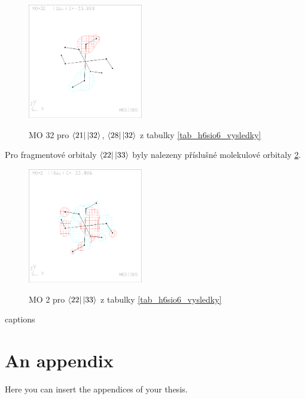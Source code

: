 \documentclass[
  digital, %
  table,   %
  lof,     %
  lot,     %
]{fithesis3}
\begin{document}
\begin{figure}[h]
\caption{MO 32 pro $\bra{21}\ket{32}$, $\bra{28}\ket{32}$  z tabulky \ref{tab_h6sio6_vysledky}}
  \center
  \includegraphics[width=5cm]{h6sio6_obrazky/s2_32.eps}
  \label{obr_h6sio6_MO_s2_32}
  \end{figure}

Pro fragmentové orbitaly $\bra{22}\ket{33}$ byly nalezeny příslušné molekulové orbitaly \ref{obr_h6sio6_MO_s3_2}.
  
  \begin{figure}[h]
\caption{MO 2 pro $\bra{22}\ket{33}$  z tabulky \ref{tab_h6sio6_vysledky}}
  \center
  \includegraphics[width=5cm]{h6sio6_obrazky/s3_2.eps}
  \label{obr_h6sio6_MO_s3_2}
  \end{figure}
 




{\csname captions\languagename\endcsname %
\makeatletter %
  \thesis@selectLocale{\thesis@locale}\makeatother
\printbibliography[heading=bibintoc]} %
\appendix %
\chapter{An appendix}
Here you can insert the appendices of your thesis.   
\end{document}
